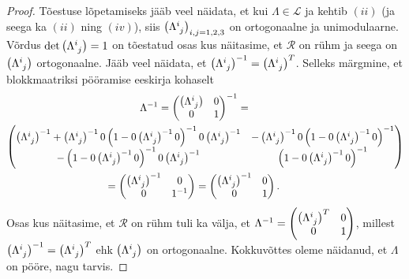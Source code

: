 \documentclass[a4paper,12pt]{article}
\theoremstyle{plain}
\theoremstyle{definition}
\numberwithin{equation}{section}
\def\L{{\mathcal L}}
\begin{document}
\begin{proof}
Tõestuse lõpetamiseks jääb veel näidata, et kui $\Lambda \in \L$ ja kehtib $(ii)$ (ja seega ka $(ii)$ ning $(iv)$), siis $\left(\Lambda\indices{^i_j}\right)_{i,j = 1, 2, 3}$ on ortogonaalne ja unimodulaarne. Võrdus $\det \left(\Lambda\indices{^i_j}\right) = 1$ on tõestatud osas kus näitasime, et $\mathcal{R}$ on rühm ja seega on $\left(\Lambda\indices{^i_j}\right)$ ortogonaalne. Jääb veel näidata, et $\left(\Lambda\indices{^i_j}\right)^{-1} = \left(\Lambda\indices{^i_j}\right)^T$. Selleks märgmine, et blokkmaatriksi pööramise eeskirja kohaselt
\begin{align*}
\Lambda^{-1} = 
\begin{pmatrix}
\left(\Lambda\indices{^i_j}\right) & 0 \\
0 & 1 \\ 
\end{pmatrix}^{-1} = \qquad\qquad\qquad\qquad\qquad\qquad\qquad\quad\\
\begin{pmatrix}
\left(\Lambda\indices{^i_j}\right)^{-1} + \left(\Lambda\indices{^i_j}\right)^{-1} 0  \left(1-0 \left(\Lambda\indices{^i_j}\right)
^{-1} 0 \right)^{-1} 0 \left(\Lambda\indices{^i_j}\right)^{-1} & -\left(\Lambda\indices{^i_j}\right)^{-1} 0 \left(1 - 0 \left
(\Lambda\indices{^i_j}\right)^{-1} 0 \right)^{-1} \\
-\left(1 - 0 \left(\Lambda\indices{^i_j}\right)^{-1} 0\right)^{-1} 0 \left(\Lambda\indices{^i_j}\right)^{-1} & \left(1 - 0 \left
(\Lambda\indices{^i_j}\right)^{-1} 0 \right)^{-1} \\
\end{pmatrix} \\
 = \begin{pmatrix}
\left(\Lambda\indices{^i_j}\right)^{-1} & 0 \\
0 & 1^{-1} \\ 
\end{pmatrix} = 
\begin{pmatrix}
\left(\Lambda\indices{^i_j}\right)^{-1} & 0 \\
0 & 1 \\ 
\end{pmatrix}. \qquad\qquad\qquad\qquad\qquad\qquad
\end{align*}
Osas kus näitasime, et $\mathcal{R}$ on rühm tuli ka välja, et $\Lambda^{-1} = \begin{pmatrix} \left(\Lambda\indices{^i_j}\right)^T & 0 \\ 0 & 1 \\ \end{pmatrix}$, millest $\left(\Lambda\indices{^i_j}\right)^{-1} = \left(\Lambda\indices{^i_j}\right)^T$ ehk $\left(\Lambda\indices{^i_j}\right)$ on ortogonaalne. Kokkuvõttes oleme näidanud, et $\Lambda$ on pööre, nagu tarvis.
\end{proof}
\end{document}
